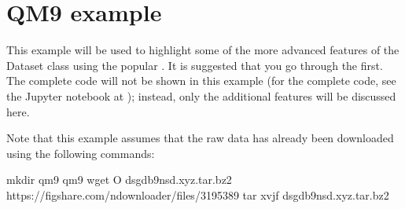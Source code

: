 \documentclass[letterpaper,10pt,english]{sphinxmanual}
\begin{document}
\begin{sphinxVerbatim}[commandchars=\\\{\}]
   

  
            \PYG{p}{[}\PYG{p}{]}
            \PYG{p}{[} \PYG{p}{]}
\end{sphinxVerbatim}


\section{QM9 example}
\label{\detokenize{qm9:qm9-example}}\label{\detokenize{qm9::doc}}
\sphinxAtStartPar
This example will be used to highlight some of the more advanced features of the
Dataset class using the popular .
It is suggested that you go through the {\hyperref[\detokenize{basic_example:basic-example}]{}} first. The complete
code will not be shown in this example (for the complete code, see the Jupyter
notebook at ); instead, only the additional features will be
discussed here.

\sphinxAtStartPar
Note that this example assumes that the raw data has already been downloaded
using the following commands:

\begin{sphinxVerbatim}[commandchars=\\\{\}]
mkdir qm9
 qm9  wget \PYGZhy{}O dsgdb9nsd.xyz.tar.bz2 https://figshare.com/ndownloader/files/3195389  tar \PYGZhy{}xvjf dsgdb9nsd.xyz.tar.bz2
\end{sphinxVerbatim}
\end{document}

